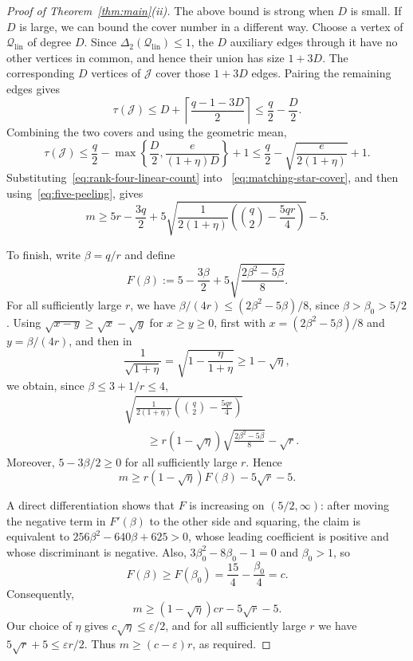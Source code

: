 \documentclass[11pt]{amsart}
\theoremstyle{remark}
\newcommand{\cJ}{\mathcal J}
\newcommand{\cQlin}{\mathcal Q_{\mathrm{lin}}}
\newcommand{\ta}{\tau}
\newcommand{\DelTwo}{\Delta_2}
\begin{document}
\begin{proof}[Proof of Theorem~\ref{thm:main}(ii)]
The above bound is strong when $D$ is small.  If $D$ is large, we can bound
the cover number in a different way.  Choose a vertex of $\cQlin$ of degree
$D$.  Since $\DelTwo(\cQlin)\le1$, the $D$ auxiliary edges through it have no
other vertices in common, and hence their union has size $1+3D$.  The
corresponding $D$ vertices of $\cJ$ cover those $1+3D$ edges.  Pairing the
remaining edges gives
\[
  \ta(\cJ)
  \le D+\left\lceil\frac{q-1-3D}{2}\right\rceil
  \le \frac q2-\frac D2.
\]
Combining the two covers and using the geometric mean,
\begin{equation}\label{eq:matching-star-cover}
  \ta(\cJ)
  \le \frac q2-
  \max\left\{\frac D2,\frac{e}{(1+\eta)D}\right\}+1
  \le \frac q2-\sqrt{\frac{e}{2(1+\eta)}}+1.
\end{equation}
Substituting~\eqref{eq:rank-four-linear-count} into
~\eqref{eq:matching-star-cover}, and then using~\eqref{eq:five-peeling},
gives
\[
  m\ge
  5r-\frac{3q}{2}
  +5\sqrt{\frac{1}{2(1+\eta)}
  \left(\binom q2-\frac{5qr}{4}\right)}-5.
\]

To finish, write $\beta=q/r$ and define
\[
  F(\beta):=
  5-\frac{3\beta}{2}
  +5\sqrt{\frac{2\beta^2-5\beta}{8}}.
\]
For all sufficiently large $r$, we have
$\beta/(4r)\le(2\beta^2-5\beta)/8$, since $\beta>\beta_0>5/2$.
Using $\sqrt{x-y}\ge\sqrt{x}-\sqrt y$ for $x\ge y\ge0$, first with
$x=(2\beta^2-5\beta)/8$ and $y=\beta/(4r)$, and then in
\[
  \frac1{\sqrt{1+\eta}}
  =\sqrt{1-\frac{\eta}{1+\eta}}\ge1-\sqrt\eta,
\]
we obtain, since $\beta\le3+1/r\le4$,
\[
\begin{aligned}
  &\sqrt{\frac{1}{2(1+\eta)}
  \left(\binom q2-\frac{5qr}{4}\right)}\\
  &\qquad\ge
  r(1-\sqrt\eta)\sqrt{\frac{2\beta^2-5\beta}{8}}
  -\sqrt r.
\end{aligned}
\]
Moreover, $5-3\beta/2\ge0$ for all sufficiently large $r$.  Hence
\[
  m\ge r(1-\sqrt\eta)F(\beta)-5\sqrt r-5.
\]

A direct differentiation shows that $F$ is increasing on $(5/2,\infty)$:
after moving the negative term in $F'(\beta)$ to the other side and
squaring, the claim is equivalent to
$256\beta^2-640\beta+625>0$, whose leading coefficient is positive and
whose discriminant is negative.  Also,
$3\beta_0^2-8\beta_0-1=0$ and $\beta_0>1$, so
\[
  F(\beta)\ge F(\beta_0)
  =\frac{15}{4}-\frac{\beta_0}{4}=c.
\]
Consequently,
\[
  m\ge (1-\sqrt\eta)cr-5\sqrt r-5.
\]
Our choice of $\eta$ gives $c\sqrt\eta\le\varepsilon/2$, and for all
sufficiently large $r$ we have $5\sqrt r+5\le\varepsilon r/2$.
Thus $m\ge(c-\varepsilon)r$, as required.
\end{proof}
\end{document}

